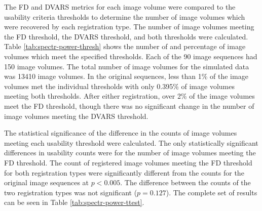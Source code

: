The FD and DVARS metrics for each image volume were compared to the usability criteria thresholds to determine the number of image volumes which were recovered by each registration type. The number of image volumes meeting the FD threshold, the DVARS threshold, and both thresholds were calculated. Table \ref{tab:spectr-power-thresh} shows the number of and percentage of image volumes which meet the specified thresholds. Each of the 90 image sequences had 150 image volumes. The total number of image volumes for the simulated data was 13410 image volumes. In the original sequences, less than 1\% of the image volumes met the individual thresholds with only 0.395\% of image volumes meeting both thresholds. After either registration, over 2\% of the image volumes meet the FD threshold, though there was no significant change in the number of image volumes meeting the DVARS threshold.

The statistical significance of the difference in the counts of image volumes meeting each usability threshold were calculated. The only statistically significant differences in usability counts were for the number of image volumes meeting the FD threshold. The count of registered image volumes meeting the FD threshold for both registration types were significantly different from the counts for the original image sequences at $p < 0.005$. The difference between the counts of the two registration types was not significant ($p = 0.127$). The complete set of results can be seen in Table \ref{tab:spectr-power-ttest}. 

